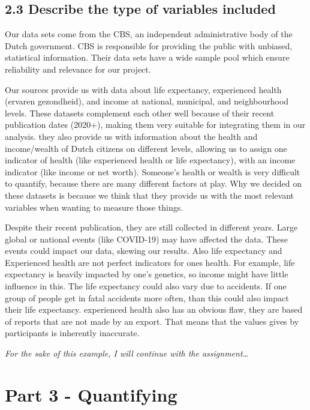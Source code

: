 \documentclass[
]{article}
\begin{document}
\subsection{2.3 Describe the type of variables
included}\label{describe-the-type-of-variables-included}

Our data sets come from the CBS, an independent administrative body of
the Dutch government. CBS is responsible for providing the public with
unbiased, statistical information. Their data sets have a wide sample
pool which ensure reliability and relevance for our project.

Our sources provide us with data about life expectancy, experienced
health (ervaren gezondheid), and income at national, municipal, and
neighbourhood levels. These datasets complement each other well because
of their recent publication dates (2020+), making them very suitable for
integrating them in our analysis. they also provide us with information
about the health and income/wealth of Dutch citizens on different
levels, allowing us to assign one indicator of health (like experienced
health or life expectancy), with an income indicator (like income or net
worth). Someone's health or wealth is very difficult to quantify,
because there are many different factors at play. Why we decided on
these datasets is because we think that they provide us with the most
relevant variables when wanting to measure those things.

Despite their recent publication, they are still collected in different
years. Large global or national events (like COVID-19) may have affected
the data. These events could impact our data, skewing our results. Also
life expectancy and Experienced health are not perfect indicators for
ones health. For example, life expectancy is heavily impacted by one's
genetics, so income might have little influence in this. The life
expectancy could also vary due to accidents. If one group of people get
in fatal accidents more often, than this could also impact their life
expectancy. experienced health also has an obvious flaw, they are based
of reports that are not made by an export. That means that the values
gives by participants is inherently inaccurate.

\emph{For the sake of this example, I will continue with the
assignment\ldots{}}

\section{Part 3 - Quantifying}\label{part-3---quantifying}
\end{document}

